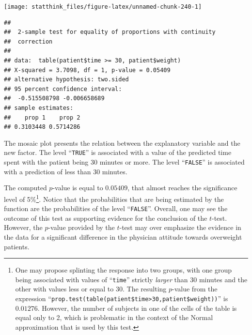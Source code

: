 \documentclass[
]{krantz}
\makeatletter
\newenvironment{Shaded}{\begin{snugshade}}{\end{snugshade}}
\newcommand{\DecValTok}[1]{\textcolor[rgb]{0.00,0.00,0.81}{#1}}
\newcommand{\KeywordTok}[1]{\textcolor[rgb]{0.13,0.29,0.53}{\textbf{#1}}}
\newcommand{\NormalTok}[1]{#1}
\newcommand{\OperatorTok}[1]{\textcolor[rgb]{0.81,0.36,0.00}{\textbf{#1}}}
\newenvironment{kframe}{%
\medskip{}
\setlength{\fboxsep}{.8em}
 \def\at@end@of@kframe{}%
 \ifinner\ifhmode%
  \def\at@end@of@kframe{\end{minipage}}%
  \begin{minipage}{\columnwidth}%
 \fi\fi%
 \def\FrameCommand##1{\hskip\@totalleftmargin \hskip-\fboxsep
 \colorbox{shadecolor}{##1}\hskip-\fboxsep
     \hskip-\linewidth \hskip-\@totalleftmargin \hskip\columnwidth}%
 \MakeFramed {\advance\hsize-\width
   \@totalleftmargin\z@ \linewidth\hsize
   \@setminipage}}%
 {\par\unskip\endMakeFramed%
 \at@end@of@kframe}
\renewenvironment{Shaded}{\begin{kframe}}{\end{kframe}}
\theoremstyle{definition}
\theoremstyle{definition}
\theoremstyle{definition}
\theoremstyle{remark}
\makeatother
\begin{document}
\begin{center}\texttt{[image: statthink\_files/figure-latex/unnamed-chunk-240-1]} \end{center}

\begin{Shaded}
\end{Shaded}

\begin{verbatim}
## 
##  2-sample test for equality of proportions with continuity
##  correction
## 
## data:  table(patient$time >= 30, patient$weight)
## X-squared = 3.7098, df = 1, p-value = 0.05409
## alternative hypothesis: two.sided
## 95 percent confidence interval:
##  -0.515508798 -0.006658689
## sample estimates:
##    prop 1    prop 2 
## 0.3103448 0.5714286
\end{verbatim}

The mosaic plot presents the relation between the explanatory
variable and the new factor.
The level ``\texttt{TRUE}'' is associated with a value of the predicted time
spent with the patient being 30 minutes or more. The level ``\texttt{FALSE}'' is
associated with a prediction of less than 30 minutes.

The computed \(p\)-value is equal to \(0.05409\), that almost reaches the
significance level of 5\%\footnote{One may propose splinting the response into two groups, with one
  group being associated with values of ``\texttt{time}'' strictly \emph{larger}
  than 30 minutes and the other with values less or equal to 30. The
  resulting \(p\)-value from the expression
  ``\texttt{prop.test(table(patient\$time\textgreater{}30,patient\$weight))}'' is \(0.01276\).
  However, the number of subjects in one of the cells of the table is
  equal only to 2, which is problematic in the context of the Normal
  approximation that is used by this test.}. Notice that the probabilities that are
being estimated by the function are the probabilities of the level
``\texttt{FALSE}''. Overall, one may see the outcome of this test as supporting
evidence for the conclusion of the \(t\)-test. However, the \(p\)-value
provided by the \(t\)-test may over emphasize the evidence in the data for
a significant difference in the physician attitude towards overweight
patients.
\end{document}
